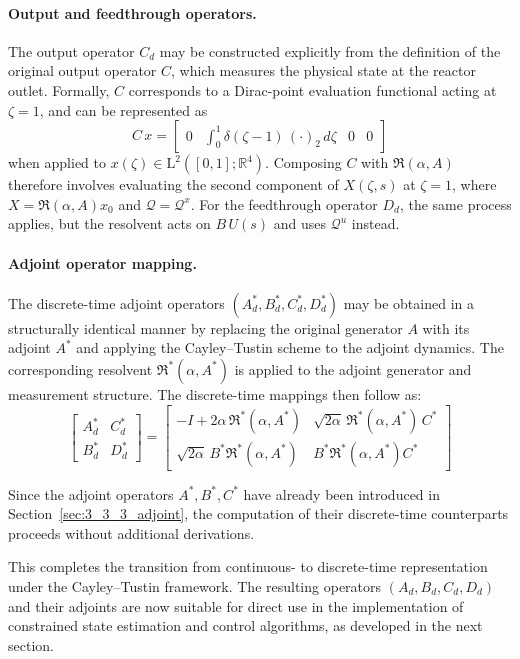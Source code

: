 \paragraph{Output and feedthrough operators.}  
The output operator $C_d$ may be constructed explicitly from the definition of the original output operator $C$, which measures the physical state at the reactor outlet. Formally, $C$ corresponds to a Dirac-point evaluation functional acting at $\zeta = 1$, and can be represented as
\begin{equation}
C\,x = \begin{bmatrix}
0 & \int_0^1 \delta(\zeta - 1)\,(\cdot)_2\,d\zeta & 0 & 0
\end{bmatrix}
\end{equation}
when applied to $x(\zeta) \in \mathrm{L}^2([0,1]; \mathbb{R}^4)$. Composing $C$ with $\mathfrak{R}(\alpha, A)$ therefore involves evaluating the second component of $X(\zeta, s)$ at $\zeta = 1$, where $X = \mathfrak{R}(\alpha, A) x_0$ and $\mathcal{Q} = \mathcal{Q}^x$. For the feedthrough operator $D_d$, the same process applies, but the resolvent acts on $B\,U(s)$ and uses $\mathcal{Q}^u$ instead.

\paragraph{Adjoint operator mapping.}  
The discrete-time adjoint operators $(A_d^*, B_d^*, C_d^*, D_d^*)$ may be obtained in a structurally identical manner by replacing the original generator $A$ with its adjoint $A^*$ and applying the Cayley--Tustin scheme to the adjoint dynamics. The corresponding resolvent $\mathfrak{R}^*(\alpha, A^*)$ is applied to the adjoint generator and measurement structure. The discrete-time mappings then follow as:
\begin{equation}
\begin{bmatrix}
A_d^* & C_d^* \\
B_d^* & D_d^*
\end{bmatrix}
=
\begin{bmatrix}
-I + 2\alpha\, \mathfrak{R}^*(\alpha, A^*) & \sqrt{2\alpha}\, \mathfrak{R}^*(\alpha, A^*)\, C^* \\
\sqrt{2\alpha}\, B^* \mathfrak{R}^*(\alpha, A^*) & B^* \mathfrak{R}^*(\alpha, A^*) C^*
\end{bmatrix}
\end{equation}

Since the adjoint operators $A^*, B^*, C^*$ have already been introduced in Section~\ref{sec:3_3_3_adjoint}, the computation of their discrete-time counterparts proceeds without additional derivations.

This completes the transition from continuous- to discrete-time representation under the Cayley--Tustin framework. The resulting operators $(A_d, B_d, C_d, D_d)$ and their adjoints are now suitable for direct use in the implementation of constrained state estimation and control algorithms, as developed in the next section.
